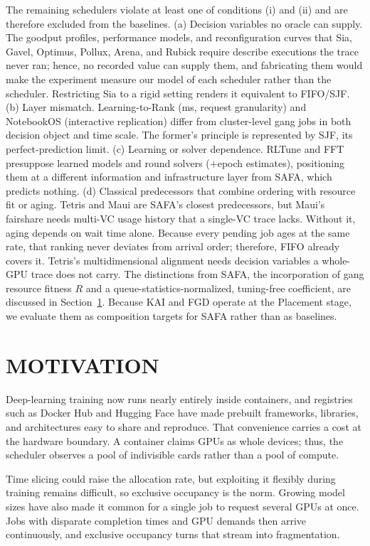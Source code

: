 \documentclass{ieeetj}
\begin{document}
The remaining schedulers violate at least one of conditions (i) and (ii) and are therefore excluded from the baselines. (a) Decision variables no oracle can supply. The goodput profiles, performance models, and reconfiguration curves that Sia, Gavel\cite{narayanan2020gavel}, Optimus, Pollux, Arena, and Rubick require describe executions the trace never ran; hence, no recorded value can supply them, and fabricating them would make the experiment measure our model of each scheduler rather than the scheduler. Restricting Sia to a rigid setting renders it equivalent to FIFO/SJF. (b) Layer mismatch. Learning-to-Rank (ms, request granularity) and NotebookOS (interactive replication) differ from cluster-level gang jobs in both decision object and time scale. The former's principle is represented by SJF, its perfect-prediction limit. (c) Learning or solver dependence. RLTune and FFT presuppose learned models and round solvers ($+$epoch estimates), positioning them at a different information and infrastructure layer from SAFA, which predicts nothing. (d) Classical predecessors that combine ordering with resource fit or aging. Tetris\cite{grandl2014multi} and Maui\cite{jackson2001maui} are SAFA's closest predecessors, but Maui's fairshare needs multi-VC usage history that a single-VC trace lacks. Without it, aging depends on wait time alone. Because every pending job ages at the same rate, that ranking never deviates from arrival order; therefore, FIFO already covers it. Tetris's multidimensional alignment needs decision variables a whole-GPU trace does not carry. The distinctions from SAFA, the incorporation of gang resource fitness $R$ and a queue-statistics-normalized, tuning-free coefficient, are discussed in Section~\ref{motivation}. Because KAI and FGD operate at the Placement stage, we evaluate them as composition targets for SAFA rather than as baselines.

\section{MOTIVATION}\label{motivation}
Deep-learning training now runs nearly entirely inside containers\cite{b7}, and registries such as Docker Hub\cite{b8} and Hugging Face\cite{b9} have made prebuilt frameworks, libraries, and architectures easy to share and reproduce. That convenience carries a cost at the hardware boundary. A container claims GPUs as whole devices; thus, the scheduler observes a pool of indivisible cards rather than a pool of compute.

Time slicing could raise the allocation rate, but exploiting it flexibly during training remains difficult, so exclusive occupancy is the norm. Growing model sizes have also made it common for a single job to request several GPUs at once. Jobs with disparate completion times and GPU demands then arrive continuously, and exclusive occupancy turns that stream into fragmentation.
\end{document}

